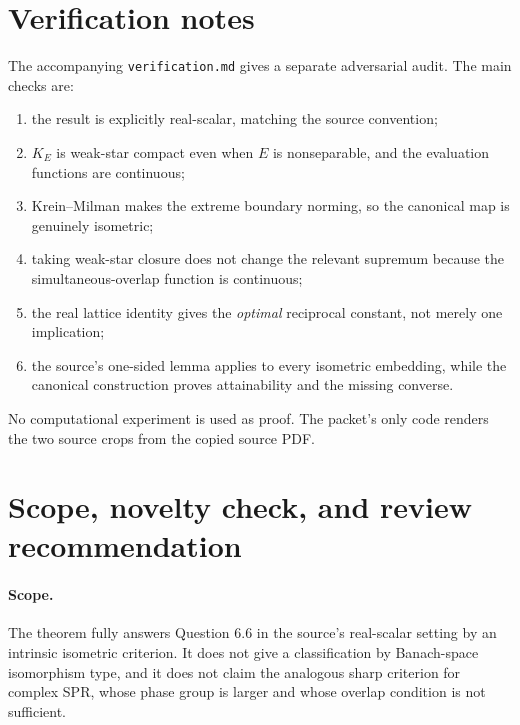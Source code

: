 \documentclass[11pt]{article}
\begin{document}
\section{Verification notes}

The accompanying \texttt{verification.md} gives a separate adversarial audit.
The main checks are:
\begin{enumerate}[leftmargin=*]
\item the result is explicitly real-scalar, matching the source convention;
\item $K_E$ is weak-star compact even when $E$ is nonseparable, and the
evaluation functions are continuous;
\item Krein--Milman makes the extreme boundary norming, so the canonical map
is genuinely isometric;
\item taking weak-star closure does not change the relevant supremum because
the simultaneous-overlap function is continuous;
\item the real lattice identity gives the \emph{optimal} reciprocal constant,
not merely one implication;
\item the source's one-sided lemma applies to every isometric embedding, while
the canonical construction proves attainability and the missing converse.
\end{enumerate}
No computational experiment is used as proof.  The packet's only code renders
the two source crops from the copied source PDF.

\section{Scope, novelty check, and review recommendation}

\paragraph{Scope.}
The theorem fully answers Question 6.6 in the source's real-scalar setting by
an intrinsic isometric criterion.  It does not give a classification by
Banach-space isomorphism type, and it does not claim the analogous sharp
criterion for complex SPR, whose phase group is larger and whose overlap
condition is not sufficient.
\end{document}
